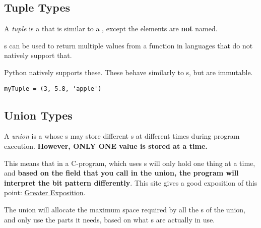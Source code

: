 \subsection{Tuple Types}\label{subsec:Tuple_Types}
\begin{definition}[Tuple]\label{def:Tuple}
  A \emph{tuple} is a  that is similar to a , except the elements are \textbf{not} named.

  \begin{remark}
    s can be used to return multiple values from a function in languages that do not natively support that.
  \end{remark}

  \begin{remark}
    Python natively supports these.
    These behave similarly to s, but are immutable.
  \end{remark}
\end{definition}

\begin{verbatim}
myTuple = (3, 5.8, 'apple')
\end{verbatim}

\subsection{Union Types}\label{subsec:Union_Types}
\begin{definition}[Union]\label{def:Union_Type}
  A \emph{union} is a  whose s may store different  s at different times during program execution.
  \textbf{However, ONLY ONE value is stored at a time.}

  This means that in a C-program, which uses s will only hold one thing at a time, and \textbf{based on the field that you call in the union, the program will interpret the bit pattern differently}.
  This site gives a good exposition of this point: \href{https://www.tutorialspoint.com/cprogramming/c_unions.htm}{Greater Exposition}.

  The union will allocate the maximum space required by all the s of the union, and only use the parts it needs, based on what s are actually in use.
\end{definition}

